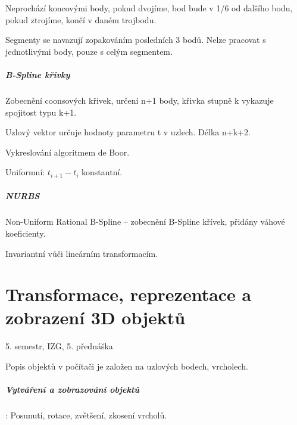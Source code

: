 \documentclass[a4paper, 11pt]{report}
\begin{document}
Neprochází koncovými body, pokud dvojíme, bod bude v 1/6 od dalšího bodu, pokud ztrojíme, končí v daném trojbodu.

Segmenty se navazují zopakováním posledních 3 bodů. Nelze pracovat s jednotlivými body, pouze s celým segmentem.

\paragraph{B-Spline křivky}

Zobecnění coonsových křivek, určení n+1 body, křivka stupně k vykazuje spojitost typu k+1.

Uzlový vektor určuje hodnoty parametru t v uzlech. Délka n+k+2. 

Vykreslování algoritmem de Boor.

Uniformní: $t_{i+1} - t_i$ konstantní.

\paragraph{NURBS} Non-Uniform Rational B-Spline -- zobecnění B-Spline křívek, přidány váhové koeficienty.

Invariantní vůči lineárním transformacím.





























\chapter{Transformace, reprezentace a zobrazení 3D objektů} \label{cha:12}

5. semestr, IZG, 5. přednáška

Popis objektů v počítači je založen na uzlových bodech, vrcholech.

\paragraph{Vytváření a zobrazování objektů}: Posunutí, rotace, zvětšení, zkosení vrcholů.
\end{document}
